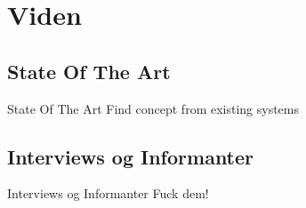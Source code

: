 \section{Viden}

\subsection{State Of The Art}
\begin{frame}{State Of The Art}
	Find concept from existing systems
\end{frame}
\subsection{Interviews og Informanter}
\begin{frame}{Interviews og Informanter}
	Fuck dem!
\end{frame}
